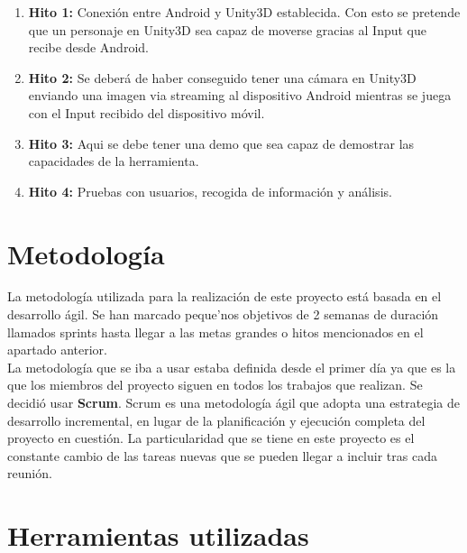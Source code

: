  
\begin{enumerate}

\item \textbf{Hito 1:} Conexi\'on entre Android y Unity3D establecida. Con esto se pretende que un personaje en Unity3D sea capaz de moverse gracias al Input que recibe desde Android.
\item \textbf{Hito 2:} Se deber\'a de haber conseguido tener una c\'amara en Unity3D enviando una imagen via streaming al dispositivo Android mientras se juega con el Input recibido del dispositivo m\'ovil.
\item \textbf{Hito 3:} Aqui se debe tener una demo que sea capaz de demostrar las capacidades de la herramienta.
\item \textbf{Hito 4:} Pruebas con usuarios, recogida de informaci\'on y an\'alisis.
\end{enumerate}



\section{Metodolog\'ia}
\label{cap3:sec:metodolog\'ia}

La metodolog\'ia utilizada para la realizaci\'on de este proyecto est\'a basada en el desarrollo \'agil. Se han marcado peque'nos objetivos de 2 semanas de duraci\'on llamados sprints hasta llegar a las metas grandes o hitos mencionados en el apartado anterior.\\
La metodolog\'ia que se iba a usar estaba definida desde el primer d\'ia ya que es la que los miembros del proyecto siguen en todos los trabajos que realizan. Se decidi\'o usar \textbf{Scrum}.
Scrum es una metodolog\'ia \'agil que adopta una estrategia de desarrollo incremental, en lugar de la planificaci\'on y ejecuci\'on completa del proyecto en cuesti\'on. La particularidad que se tiene en este proyecto es el constante cambio de las tareas nuevas que se pueden llegar a incluir tras cada reuni\'on.

\section{Herramientas utilizadas}
\label{cap3:sec:herramientas}

